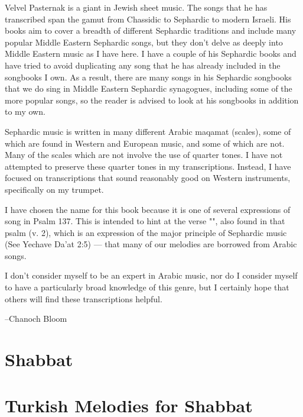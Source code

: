 \documentclass[letterpaper]{memoir}
\newcommand{\song}[2]{}
\begin{document}
Velvel Pasternak is a giant in Jewish sheet music. The songs that he has 
transcribed span the gamut from Chassidic to Sephardic to modern 
Israeli. His books aim to cover a breadth of different Sephardic 
traditions and include many popular Middle Eastern Sephardic songs, but 
they don't delve as deeply into Middle Eastern music as I have here.
I have a couple of his Sephardic books and have tried to avoid 
duplicating any song that he has already included in the songbooks I 
own.
As a result, there are many songs in his Sephardic songbooks 
that we do sing in Middle Eastern Sephardic synagogues, including some 
of the more popular songs, so the reader is advised to look at his 
songbooks in addition to my own.

Sephardic music is written in many different Arabic maqamat (scales), some of 
which are found in Western and European music, and some of which are not. 
Many of the scales which are not involve the use of 
quarter tones. I have not attempted to preserve these quarter tones in my 
transcriptions. Instead, I have focused on transcriptions that sound 
reasonably good on Western instruments, specifically on my trumpet.

I have chosen the name  for this book because it is one 
of several expressions of song in Psalm 137. This is intended to hint at the verse
"", also found in that psalm (v. 2), 
which is an expression of the major principle of Sephardic music (See 
Yechave Da'at 2:5) --- that many of our melodies are borrowed from 
Arabic songs.

I don't consider myself to be an expert in Arabic music, nor do I 
consider myself to have a particularly broad knowledge of this genre,
but I certainly hope that others will find these transcriptions helpful.

--Chanoch Bloom


\chapter{Shabbat}
\song{Ashir La'el Asher Shavat}{Ashir_Lael_Asher_Shavat.pdf}

\chapter{Turkish Melodies for Shabbat}
\song{Yoducha Rayonai}{Yoducha_Rayonai_Turkish_with_octave_up.pdf}
\song{Yom HaShabbat Ein Kamohu}{Yom_HaShabbat_Ein_Kamohu_Turkish.pdf}
\song{Ki Eshmerah Shabbat}{Ki_Eshmerah_Shabbat_Turkish.pdf}
\end{document}
